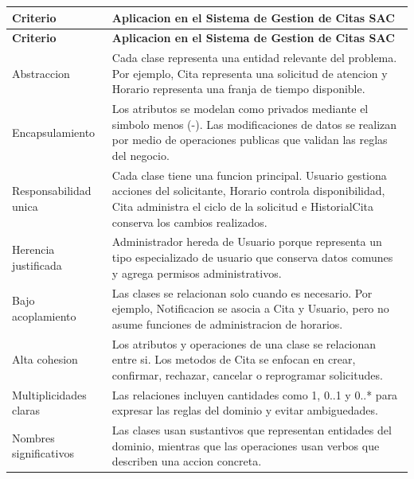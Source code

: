 \documentclass[12pt,letterpaper]{article}
\begin{document}
\begin{longtable}{|p{4cm}|p{10.5cm}|}
\hline
\textbf{Criterio} & \textbf{Aplicacion en el Sistema de Gestion de Citas SAC} \\
\hline
\endfirsthead
\hline
\textbf{Criterio} & \textbf{Aplicacion en el Sistema de Gestion de Citas SAC} \\
\hline
\endhead
\hline
\endfoot
\hline
\endlastfoot

Abstraccion & Cada clase representa una entidad relevante del problema. Por ejemplo, Cita representa una solicitud de atencion y Horario representa una franja de tiempo disponible. \\
\hline

Encapsulamiento & Los atributos se modelan como privados mediante el simbolo menos (-). Las modificaciones de datos se realizan por medio de operaciones publicas que validan las reglas del negocio. \\
\hline

Responsabilidad unica & Cada clase tiene una funcion principal. Usuario gestiona acciones del solicitante, Horario controla disponibilidad, Cita administra el ciclo de la solicitud e HistorialCita conserva los cambios realizados. \\
\hline

Herencia justificada & Administrador hereda de Usuario porque representa un tipo especializado de usuario que conserva datos comunes y agrega permisos administrativos. \\
\hline

Bajo acoplamiento & Las clases se relacionan solo cuando es necesario. Por ejemplo, Notificacion se asocia a Cita y Usuario, pero no asume funciones de administracion de horarios. \\
\hline

Alta cohesion & Los atributos y operaciones de una clase se relacionan entre si. Los metodos de Cita se enfocan en crear, confirmar, rechazar, cancelar o reprogramar solicitudes. \\
\hline

Multiplicidades claras & Las relaciones incluyen cantidades como 1, 0..1 y 0..* para expresar las reglas del dominio y evitar ambiguedades. \\
\hline

Nombres significativos & Las clases usan sustantivos que representan entidades del dominio, mientras que las operaciones usan verbos que describen una accion concreta. \\
\hline
\end{longtable}
\end{document}
